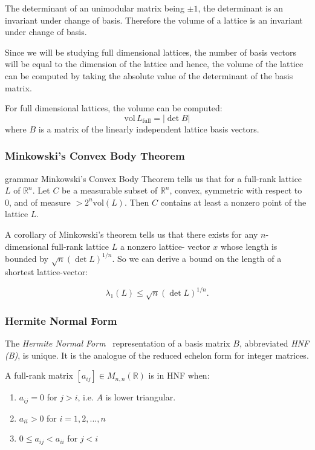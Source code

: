 \documentclass[10pt, a4paper]{article}
\newcommand{\my}[1]{{\color{blue} #1 }}
\begin{document}
The determinant of an unimodular matrix being $\pm 1$, the determinant is an invariant under change of basis. Therefore the volume of a lattice is an invariant under change of basis.

Since we will be studying full dimensional lattices, the number of basis vectors will be equal to the dimension of the lattice and hence, the volume of the lattice can be computed by taking the absolute value of the determinant of the basis matrix.

For full dimensional lattices, the volume can be computed:
\[
\text{vol} \,L_{\text{full}} = |\det B|
\] where $B$ is a matrix of the linearly independent lattice basis vectors.


\subsubsection{Minkowski's Convex Body Theorem}

\my{grammar} Minkowski's Convex Body Theorem tells us that for a full-rank lattice $L$ of $\mathbb{R}^n$. Let $C$ be a measurable subset of $\mathbb{R}^n$, convex, symmetric with respect to 0, and of measure $> 2^n \text{vol}(L)$. Then $C$ contains at least a nonzero point of the lattice $L$.

A corollary of Minkowski's theorem tells us that there exists for any $n$-dimensional full-rank lattice $L$ a nonzero \my{lattice-}vector $x$ \my{whose length is bounded by $\sqrt{n} (\det L)^{1/n}$. So we can derive a bound on the length of a shortest lattice-vector:}

\[
\lambda_1(L) \leq \sqrt{n} (\det L)^{1/n}.
\]



\subsubsection{Hermite Normal Form}

The \emph{Hermite Normal Form}~\cite{SchnorrStanfordNotes} representation of a basis matrix $B$, abbreviated \emph{HNF (B)}, is unique. It is the analogue of the reduced echelon form for integer matrices.

A full-rank matrix $[a_{ij}] \in M_{n,n} (\mathbb{R})$ is in HNF when:
\begin{enumerate}
\item $a_{ij} = 0$ for $j > i$, i.e. $A$ is lower triangular. 
\item $a_{ii} > 0$ for $i=1,2,...,n$
\item $0 \leq a_{ij} < a_{ii}$ for $j < i$
\end{enumerate}
\end{document}
